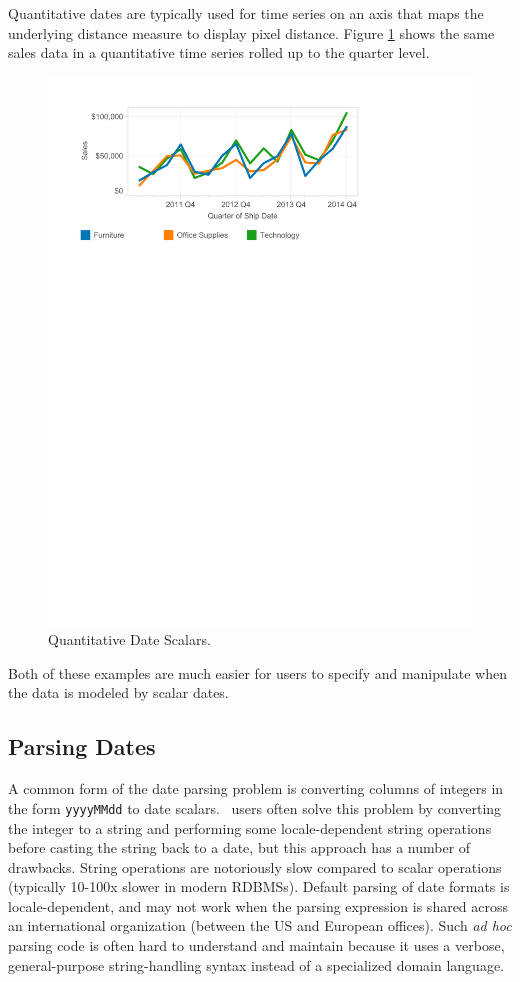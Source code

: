 Quantitative dates are typically used for time series on an axis that maps the underlying distance measure to display pixel distance. 
Figure \ref{fig:I2} shows the same sales data in a quantitative time series rolled up to the quarter level.

\begin{figure}[ht]
\centering
\includegraphics[width=\columnwidth]{figures/FigureI2}
\caption{Quantitative Date Scalars.}
\label{fig:I2}
\end{figure}

Both of these examples are much easier for users to specify and manipulate when the data is modeled by scalar dates.


\subsection{Parsing Dates}
A common form of the date parsing problem is converting columns of integers in the form \texttt{yyyyMMdd} to date scalars. \Naive\ users often solve this problem by converting the integer to a string and performing some locale-dependent string operations before casting the string back to a date, but this approach has a number of drawbacks. String operations are notoriously slow compared to scalar operations (typically 10-100x slower in modern RDBMSs). Default parsing of date formats is locale-dependent, and may not work when the parsing expression is shared across an international organization (\eg between the US and European offices). Such \textit{ad hoc} parsing code is often hard to understand and maintain because it uses a verbose, general-purpose string-handling syntax instead of a specialized domain language.


